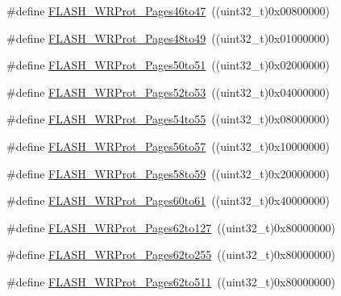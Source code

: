 \begin{DoxyCompactItemize}
\item 
\#define \mbox{\hyperlink{group___option___bytes___write___protection_ga8c9bd2510c0af75911a6b24271a33c95}{F\+L\+A\+S\+H\+\_\+\+W\+R\+Prot\+\_\+\+Pages46to47}}~((uint32\+\_\+t)0x00800000)
\item 
\#define \mbox{\hyperlink{group___option___bytes___write___protection_ga12744383aa65b2eb38e37d41a12bb6fe}{F\+L\+A\+S\+H\+\_\+\+W\+R\+Prot\+\_\+\+Pages48to49}}~((uint32\+\_\+t)0x01000000)
\item 
\#define \mbox{\hyperlink{group___option___bytes___write___protection_ga053321e47944270a5fdcf0d58e16ec13}{F\+L\+A\+S\+H\+\_\+\+W\+R\+Prot\+\_\+\+Pages50to51}}~((uint32\+\_\+t)0x02000000)
\item 
\#define \mbox{\hyperlink{group___option___bytes___write___protection_gae4eefefb23e8913e4aa558a6a2599fa5}{F\+L\+A\+S\+H\+\_\+\+W\+R\+Prot\+\_\+\+Pages52to53}}~((uint32\+\_\+t)0x04000000)
\item 
\#define \mbox{\hyperlink{group___option___bytes___write___protection_gacd4ea5e6cc3819f40a55a61f3075b626}{F\+L\+A\+S\+H\+\_\+\+W\+R\+Prot\+\_\+\+Pages54to55}}~((uint32\+\_\+t)0x08000000)
\item 
\#define \mbox{\hyperlink{group___option___bytes___write___protection_ga1779d1131ad245861c61dbf43a2d2d3d}{F\+L\+A\+S\+H\+\_\+\+W\+R\+Prot\+\_\+\+Pages56to57}}~((uint32\+\_\+t)0x10000000)
\item 
\#define \mbox{\hyperlink{group___option___bytes___write___protection_ga4a05bf4eec7521ae90ff662db2a9f4f5}{F\+L\+A\+S\+H\+\_\+\+W\+R\+Prot\+\_\+\+Pages58to59}}~((uint32\+\_\+t)0x20000000)
\item 
\#define \mbox{\hyperlink{group___option___bytes___write___protection_ga22f620be7f346efcb2cbb732b879fd0c}{F\+L\+A\+S\+H\+\_\+\+W\+R\+Prot\+\_\+\+Pages60to61}}~((uint32\+\_\+t)0x40000000)
\item 
\#define \mbox{\hyperlink{group___option___bytes___write___protection_ga346285408d8f738796fc22d710777ba9}{F\+L\+A\+S\+H\+\_\+\+W\+R\+Prot\+\_\+\+Pages62to127}}~((uint32\+\_\+t)0x80000000)
\item 
\#define \mbox{\hyperlink{group___option___bytes___write___protection_gacec4a825ff505ef5751ec6e5cf6d941e}{F\+L\+A\+S\+H\+\_\+\+W\+R\+Prot\+\_\+\+Pages62to255}}~((uint32\+\_\+t)0x80000000)
\item 
\#define \mbox{\hyperlink{group___option___bytes___write___protection_gab233da6081eaf5d664f16c0e8c7df138}{F\+L\+A\+S\+H\+\_\+\+W\+R\+Prot\+\_\+\+Pages62to511}}~((uint32\+\_\+t)0x80000000)
\item 

\end{DoxyCompactItemize}
